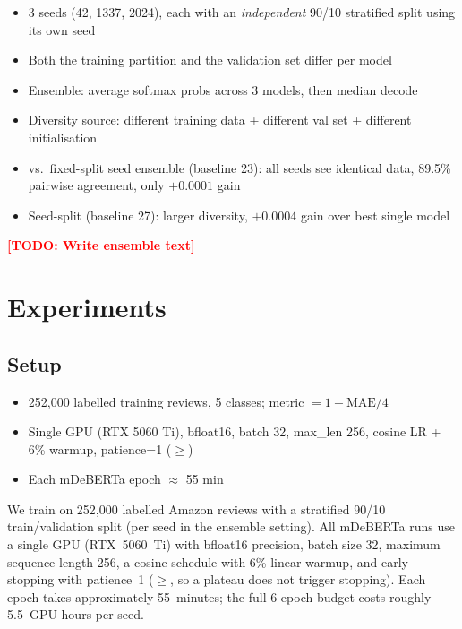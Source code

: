 \documentclass{article}
\newcommand{\TODO}[1]{\textcolor{red}{\textbf{[TODO: #1]}}}
\begin{document}
\begin{itemize}[leftmargin=*,itemsep=1pt]
  \item 3 seeds (42, 1337, 2024), each with an \textit{independent} 90/10
        stratified split using its own seed
  \item Both the training partition and the validation set differ per model
  \item Ensemble: average softmax probs across 3 models, then median decode
  \item Diversity source: different training data + different val set +
        different initialisation
  \item vs.\ fixed-split seed ensemble (baseline 23): all seeds see
        identical data, 89.5\% pairwise agreement, only $+0.0001$ gain
  \item Seed-split (baseline 27): larger diversity, $+0.0004$ gain over
        best single model
\end{itemize}

\TODO{Write ensemble text}

\section{Experiments}
\label{sec:experiments}

\subsection{Setup}

\begin{itemize}[leftmargin=*,itemsep=1pt]
  \item 252{,}000 labelled training reviews, 5 classes;
        metric $= 1 - \text{MAE}/4$
  \item Single GPU (RTX 5060 Ti), bfloat16, batch 32, max\_len 256,
        cosine LR + 6\% warmup, patience=1 ($\geq$)
  \item Each mDeBERTa epoch $\approx$ 55 min
\end{itemize}

We train on 252{,}000 labelled Amazon reviews with a stratified 90/10
train/validation split (per seed in the ensemble setting).
All mDeBERTa runs use a single GPU (RTX~5060~Ti) with bfloat16 precision,
batch size 32, maximum sequence length 256, a cosine schedule with 6\%
linear warmup, and early stopping with patience~1 ($\geq$, so a
plateau does not trigger stopping).
Each epoch takes approximately 55~minutes; the full 6-epoch budget costs
roughly 5.5~GPU-hours per seed.
\end{document}
